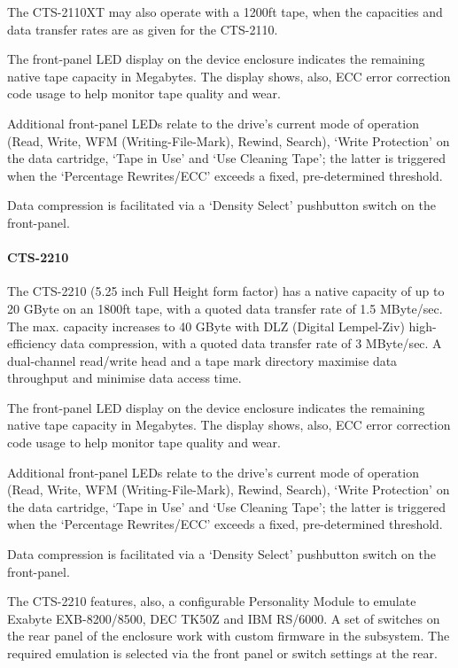 The CTS-2110XT may also operate with a 1200ft tape, when the capacities and
data transfer rates are as given for the CTS-2110.

The front-panel LED display on the device enclosure indicates the remaining
native tape capacity in Megabytes. The display shows, also, ECC error
correction code usage to help monitor tape quality and wear.

Additional front-panel LEDs relate to the drive's current mode of operation
(Read, Write, WFM (Writing-File-Mark), Rewind, Search), `Write Protection' on
the data cartridge, `Tape in Use' and `Use Cleaning Tape'; the latter is
triggered when the `Percentage Rewrites/ECC' exceeds a fixed, pre-determined
threshold.

Data compression is facilitated via a `Density Select' pushbutton switch on the
front-panel.

\paragraph {CTS-2210}

The CTS-2210 (5.25 inch Full Height form factor) has a native capacity of up
to 20 GByte on an 1800ft tape, with a quoted data transfer rate of 1.5
MByte/sec. The max. capacity increases to 40 GByte with DLZ (Digital Lempel-Ziv)
high-efficiency data compression, with a quoted data transfer rate of 3
MByte/sec. A dual-channel read/write head and a tape mark directory maximise
data throughput and minimise data access time.

The front-panel LED display on the device enclosure indicates the remaining
native tape capacity in Megabytes. The display shows, also, ECC error
correction code usage to help monitor tape quality and wear.

Additional front-panel LEDs relate to the drive's current mode of operation
(Read, Write, WFM (Writing-File-Mark), Rewind, Search), `Write Protection' on
the data cartridge, `Tape in Use' and `Use Cleaning Tape'; the latter is
triggered when the `Percentage Rewrites/ECC' exceeds a fixed, pre-determined
threshold.

Data compression is facilitated via a `Density Select' pushbutton switch on the
front-panel.

The CTS-2210 features, also, a configurable Personality Module to emulate
Exabyte EXB-8200/8500, DEC TK50Z and IBM RS/6000. A set of switches on the rear
panel of the enclosure work with custom firmware in the subsystem. The required
emulation is selected via the front panel or switch settings at the rear.

